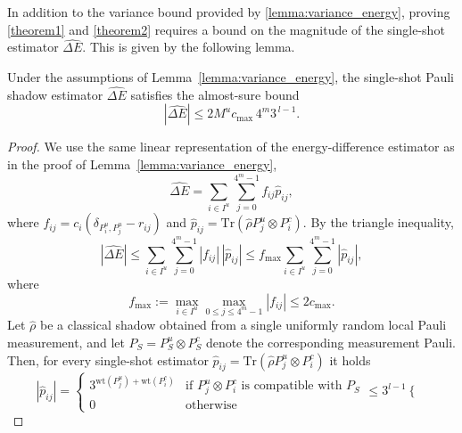 In addition to the variance bound provided by \cref{lemma:variance_energy}, proving \cref{theorem1} and \cref{theorem2} requires a bound on the magnitude of the single-shot estimator $\hat{\Delta E}$. This is given by the following lemma.
\begin{lemma}
    \label{lemma:singleshot_energy}
    Under the assumptions of Lemma~\ref{lemma:variance_energy}, the single-shot Pauli shadow estimator $\hat{\Delta E}$ satisfies the almost-sure bound
    \begin{equation}
        \left|\hat{\Delta E}\right|\leq2 M^u c_{\max} \, 4^{m} 3^{\,l-1}.
    \end{equation}
\end{lemma}
\begin{proof}
    We use the same linear representation of the energy-difference estimator as in the proof of Lemma~\ref{lemma:variance_energy},
    \begin{equation}
        \hat{\Delta E}=\sum_{i\in I^u}\sum_{j=0}^{4^m-1}f_{ij}\hat{p}_{ij},
    \end{equation}
    where $f_{ij}=c_i(\delta_{P_i^u,P_j^u}-r_{ij})$ and $\hat{p}_{ij}=\mathrm{Tr}\left(\hat{\rho}P^u_j\otimes P^c_i \right)$. By the triangle inequality,
    \begin{equation}
        \label{eq:ss_triangle}
        \left|\hat{\Delta E}\right|\leq\sum_{i\in I^u}\sum_{j=0}^{4^m-1} |f_{ij}|\,|\hat p_{ij}|\leq f_\mathrm{max}\sum_{i\in I^u}\sum_{j=0}^{4^m-1}|\hat p_{ij}|,
    \end{equation}
    where
    \begin{equation}
        f_\mathrm{max}:=\max_{i\in I^u}\max_{0\leq j \leq 4^m-1}\left|f_{ij}\right|\leq 2c_\mathrm{max}.
    \end{equation}
    Let $\hat{\rho}$ be a classical shadow obtained from a single uniformly random local Pauli measurement, and let $P_S=P_S^u\otimes P^c_S$ denote the corresponding measurement Pauli. Then, for every single-shot estimator $\hat{p}_{ij}=\mathrm{Tr}\left(\hat{\rho}P^u_j\otimes P^c_i \right)$ it holds
    \begin{equation}
        \left| \hat{p}_{ij}\right|=\begin{cases}
            3^{\mathrm{wt}(P^u_j)+\mathrm{wt}(P^c_i)}&\text{if $P^u_j\otimes P^c_i$ is compatible with $P_S$}\\
            0&\text{otherwise}
        \end{cases}\leq3^{l-1}\begin{cases}

\end{cases}
\end{equation}
\end{proof}
